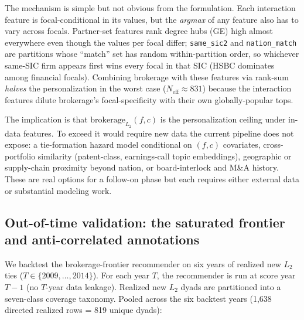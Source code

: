 \documentclass[11pt,letterpaper]{article}
\begin{document}
The mechanism is simple but not obvious from the formulation.  Each
interaction feature is focal-conditional in its values, but the
\emph{argmax} of any feature also has to vary across focals.
Partner-set features rank degree hubs (GE) high almost everywhere
even though the values per focal differ; \texttt{same\_sic2} and
\texttt{nation\_match} are partitions whose ``match'' set has
random within-partition order, so whichever same-SIC firm appears
first wins every focal in that SIC (HSBC dominates among financial
focals).  Combining brokerage with these features via rank-sum
\emph{halves} the personalization in the worst case ($N_{\mathrm{eff}}
\approx 831$) because the interaction features dilute brokerage's
focal-specificity with their own globally-popular tops.

The implication is that $\text{brokerage}_{L_2}(f, c)$ is the
personalization ceiling under in-data features.  To exceed it would
require new data the current pipeline does not expose: a tie-formation
hazard model conditional on $(f, c)$ covariates, cross-portfolio
similarity (patent-class, earnings-call topic embeddings), geographic
or supply-chain proximity beyond nation, or board-interlock and M\&A
history.  These are real options for a follow-on phase but each
requires either external data or substantial modeling work.

\subsection{Out-of-time validation: the saturated frontier and
            anti-correlated annotations}
\label{sec:phase9b-lite}

We backtest the brokerage-frontier recommender on six years of
realized new $L_2$ ties ($T \in \{2009, \ldots, 2014\}$).  For each
year $T$, the recommender is run at score year $T-1$ (no $T$-year
data leakage).  Realized new $L_2$ dyads are partitioned into a
seven-class coverage taxonomy.  Pooled across the six backtest
years (1{,}638 directed realized rows = 819 unique dyads):
\end{document}
